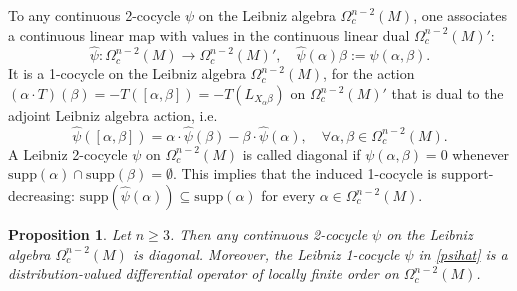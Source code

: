 \documentclass{article}
\newcommand{\supp}{\mathrm{supp}}
\newtheorem{Proposition}[Theorem]{Proposition}
\theoremstyle{definition}
\begin{document}
To any continuous 2-cocycle $\psi$ on the Leibniz algebra $\Omega_c^{n-2}(M)$, one associates  
a continuous linear map with values in the continuous linear dual $\Omega_c^{n-2}(M)'$:
\begin{equation}\label{psihat}
\widehat\psi:\Omega^{n-2}_{c}(M)\to \Omega^{n-2}_{c}(M)',\quad \widehat\psi(\alpha)\beta:=\psi(\alpha,\beta).
\end{equation}
It is a 1-cocycle on the Leibniz algebra $\Omega_c^{n-2}(M)$, 
for the action $(\alpha\cdot T)(\beta)=-T([\alpha,\beta])=-T(L_{X_\alpha \beta})$ on $\Omega_c^{n-2}(M)'$ that is dual to the adjoint Leibniz algebra action, i.e.
\begin{equation}\label{eq:OneCocyclefirst}
\widehat\psi([\alpha,\beta]) = \alpha \cdot \widehat\psi(\beta) - \beta \cdot \widehat\psi(\alpha),\quad\forall\alpha,\beta\in\Omega_c^{n-2}(M).
\end{equation}
A Leibniz 2-cocycle $\psi$ on  $\Omega_c^{n-2}(M)$  is called diagonal 
if $\psi( \alpha,\beta) =0$ whenever $\supp( \alpha ) \cap\supp(\beta)=\emptyset$.
This implies that the induced 1-cocycle is support-decreasing:
 $\supp(\widehat\psi(\alpha))\subseteq \supp(\alpha)$ for every $\alpha\in\Omega_c^{n-2}(M)$.


\begin{Proposition}\label{Lemma:ClosedImpliesLocal}
Let $n\geq 3$. Then
any continuous 2-cocycle $\psi$ on the Leibniz algebra $\Omega^{n-2}_{c}(M)$ is diagonal.
Moreover, the Leibniz 1-cocycle $\widehat\psi$ in \eqref{psihat} is a distribution-valued differential operator of locally finite order on $\Omega_{c}^{n-2}(M)$.
\end{Proposition}
\end{document}
